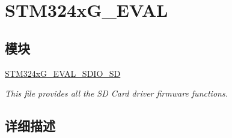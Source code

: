 \hypertarget{group___s_t_m324x_g___e_v_a_l}{}\section{S\+T\+M324x\+G\+\_\+\+E\+V\+AL}
\label{group___s_t_m324x_g___e_v_a_l}
\subsection*{模块}
\begin{DoxyCompactItemize}
\item 
\hyperlink{group___s_t_m324x_g___e_v_a_l___s_d_i_o___s_d}{S\+T\+M324x\+G\+\_\+\+E\+V\+A\+L\+\_\+\+S\+D\+I\+O\+\_\+\+SD}
\begin{DoxyCompactList}\small\item\em This file provides all the SD Card driver firmware functions. \end{DoxyCompactList}\end{DoxyCompactItemize}


\subsection{详细描述}
